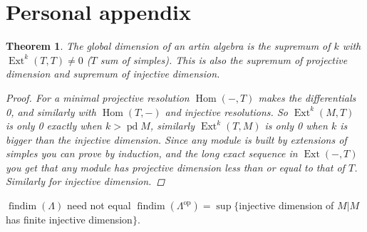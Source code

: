 \documentclass[11pt, english, twoside]{article}
\newtheorem{theorem}{Theorem}[section]
\theoremstyle{definition}
\DeclareMathOperator{\Hom}{Hom}
\DeclareMathOperator{\Ext}{Ext}
\DeclareMathOperator{\findim}{findim}
\DeclareMathOperator{\pd}{pd}
\begin{document}
\section{Personal appendix}
\begin{theorem}
	The global dimension of an artin algebra is the supremum of $k$ with $\Ext^k(T,T)\neq 0$ ($T$ sum of simples). This is also the supremum of projective dimension and supremum of injective dimension.
	\begin{proof}
		For a minimal projective resolution $\Hom(-,T)$ makes the differentials 0, and similarly with $\Hom(T,-)$ and injective resolutions. So $\Ext^k(M, T)$ is only 0 exactly when $k>\pd M$, similarly $\Ext^k(T,M)$ is only 0 when $k$ is bigger than the injective dimension. Since any module is built by extensions of simples you can prove by induction, and the long exact sequence in $\Ext(-,T)$ you get that any module has projective dimension less than or equal to that of $T$. Similarly for injective dimension.
	\end{proof}
\end{theorem}

$\findim(\Lambda)$ need not equal $\findim(\Lambda^{\operatorname{op}}) = \sup\{ $injective dimension of $M | M$ has finite injective dimension$ \}$.
\end{document}
